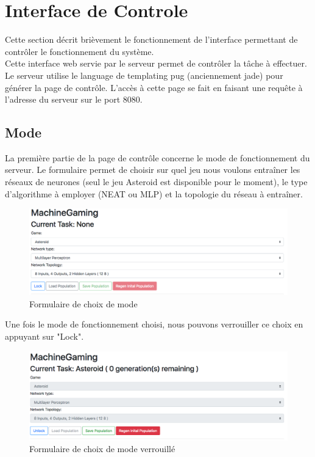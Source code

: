 \documentclass{article}
\begin{document}
\newpage
\section{Interface de Controle}

Cette section décrit brièvement le fonctionnement de l'interface permettant de contrôler le fonctionnement du système.\\

Cette interface web servie par le serveur permet de contrôler la tâche à effectuer. Le serveur utilise le language de templating pug (anciennement jade) pour générer la page de contrôle. L'accès à cette page se fait en faisant une requête à l'adresse du serveur sur le port 8080.\\

\subsection{Mode}

La première partie de la page de contrôle concerne le mode de fonctionnement du serveur. Le formulaire permet de choisir sur quel jeu  nous voulons entraîner les réseaux de neurones (seul le jeu Asteroid est disponible pour le moment), le type d'algorithme à employer (NEAT ou MLP) et la topologie du réseau à entraîner.

\begin{figure}[H]
\begin{center}
	\includegraphics[scale=0.4]{unlockedmode.png} 
	\caption{Formulaire de choix de mode}
\end{center}
\end{figure}

Une fois le mode de fonctionnement choisi, nous pouvons verrouiller ce choix en appuyant sur "Lock". 

\begin{figure}[H]
\begin{center}
	\includegraphics[scale=0.4]{lockedmode.png} 
	\caption{Formulaire de choix de mode verrouillé}
\end{center}
\end{figure}
\end{document}
